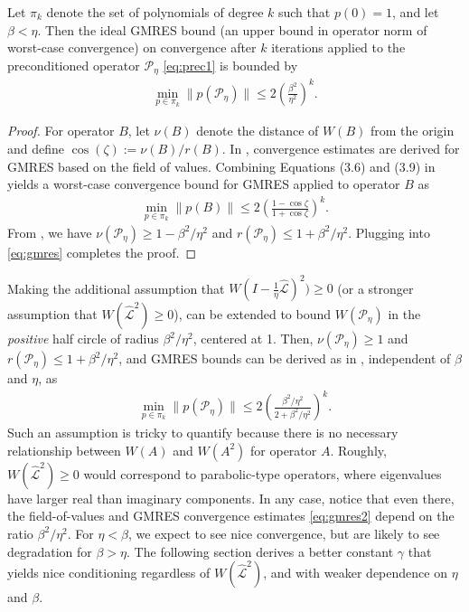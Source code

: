 \documentclass[review]{siamart}
\begin{document}
%
\begin{corollary}\label{cor:gmres}
Let $\pi_k$ denote the set of polynomials of degree $k$ such that $p(0) = 1$,
and let $\beta < \eta$. Then the ideal GMRES bound (an upper bound in operator
norm of worst-case convergence) on convergence after $k$ iterations
applied to the preconditioned operator $\mathcal{P}_\eta$ \eqref{eq:prec1}
is bounded by
\begin{align*}
\min_{p\in\pi_k} \|p(\mathcal{P}_\eta)\| \leq 2\left(\frac{\beta^2}{\eta^2}\right)^k.
\end{align*}
\end{corollary}
\begin{proof}
For operator $B$, let $\nu(B)$ denote the distance of $W(B)$ from the origin and define
$\cos(\zeta) := \nu(B) / r(B)$. In \cite{liesen2012field}, convergence
estimates are derived for GMRES based on the field of values. Combining Equations (3.6)
and (3.9) in \cite{liesen2012field} yields a worst-case convergence bound for GMRES
applied to operator $B$ as
%
\begin{align}\label{eq:gmres}
\min_{p\in\pi_k} \|p(B)\| \leq 2\left(\frac{1-\cos\zeta}{1+\cos\zeta}\right)^k.
\end{align}
%
From , we have $\nu(\mathcal{P}_\eta) \geq 1-\beta^2/\eta^2$ and
$r(\mathcal{P}_\eta) \leq 1+\beta^2/\eta^2$. Plugging into
\eqref{eq:gmres} completes the proof.
\end{proof}
%

Making the additional assumption that
$W(I - \tfrac{1}{\eta}\widehat{\mathcal{L}})^2) \geq 0$
(or a stronger assumption that $W(\widehat{\mathcal{L}}^2) \geq 0$),
 can be extended to bound $W(\mathcal{P}_\eta)$
in the \textit{positive} half circle of radius $\beta^2/\eta^2$, centered at 1. Then,
$\nu(\mathcal{P}_\eta)\geq 1$ and $r(\mathcal{P}_\eta) \leq 1+\beta^2/\eta^2$,
and GMRES bounds can be derived as in , independent of $\beta$
and $\eta$, as
%
\begin{align}\label{eq:gmres2}
\min_{p\in\pi_k} \|p(\mathcal{P}_\eta)\| \leq 2\left(\frac{\beta^2/\eta^2}
	{2 + \beta^2/\eta^2}\right)^k.
\end{align}
%
Such an assumption is tricky to quantify because there is no necessary relationship
between $W(A)$ and $W(A^2)$ for operator $A$. Roughly,
$W(\widehat{\mathcal{L}}^2)\geq 0$ would correspond to parabolic-type
operators, where eigenvalues have larger real than imaginary components.
In any case, notice that even there, the field-of-values and GMRES convergence 
estimates \eqref{eq:gmres2} depend on the ratio $\beta^2/\eta^2$. For
$\eta < \beta$, we expect to see nice convergence, but are likely to see degradation
for $\beta > \eta$. The following section derives a better constant $\gamma$
that yields nice conditioning regardless of $W(\widehat{\mathcal{L}}^2)$,
and with weaker dependence on $\eta$ and $\beta$.
\end{document}
